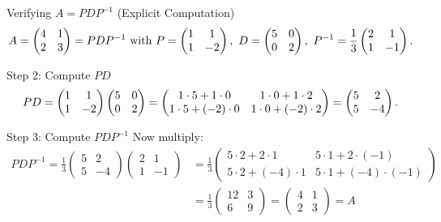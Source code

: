 \documentclass[aspectratio=169]{beamer}
\begin{document}
\begin{frame}{Verifying $A = P D P^{-1}$ (Explicit Computation)}
\vspace{-5mm}
\[
A =
\begin{pmatrix}
4 & 1\\
2 & 3
\end{pmatrix}
=
P D P^{-1}
\,\, \text{with} \,\,
P =
\begin{pmatrix}
1 & 1\\
1 & -2
\end{pmatrix},
\,\,
D =
\begin{pmatrix}
5 & 0\\
0 & 2
\end{pmatrix},
\,\,
P^{-1}
=\frac{1}{3}
\begin{pmatrix}
2 & 1\\
1 & -1
\end{pmatrix}.
\vspace{-5mm}
\]
\begin{block}{Step 2: Compute $P D$}
\vspace{-4mm}
\[
P D
=
\begin{pmatrix}
1 & 1\\
1 & -2
\end{pmatrix}
\begin{pmatrix}
5 & 0\\
0 & 2
\end{pmatrix}
=
\begin{pmatrix}
1\cdot5 + 1\cdot0 & 1\cdot0 + 1\cdot2\\
1\cdot5 + (-2)\cdot0 & 1\cdot0 + (-2)\cdot2
\end{pmatrix}
=
\begin{pmatrix}
5 & 2\\
5 & -4
\end{pmatrix}.
\vspace{-6mm}
\]
\end{block}

\pause
\begin{block}{Step 3: Compute $P D P^{-1}$}
Now multiply:
\begin{align*}
P D P^{-1}
= \frac{1}{3}
\begin{pmatrix}
5 & 2\\
5 & -4
\end{pmatrix}
\begin{pmatrix}
2& 1\\
1 & -1
\end{pmatrix}
&= \frac{1}{3}
\begin{pmatrix}
5\cdot2 + 2\cdot1 & 5\cdot1 + 2\cdot(-1)\\[4pt]
5\cdot2 + (-4)\cdot1 & 5\cdot1 + (-4)\cdot(-1)
\end{pmatrix}
\\
&= \frac{1}{3}
\begin{pmatrix}
12 & 3\\
6 & 9
\end{pmatrix}
=
\begin{pmatrix}
4 & 1\\
2 & 3
\end{pmatrix}
=
A
\end{align*}
\end{block}

\end{frame}
\end{document}
